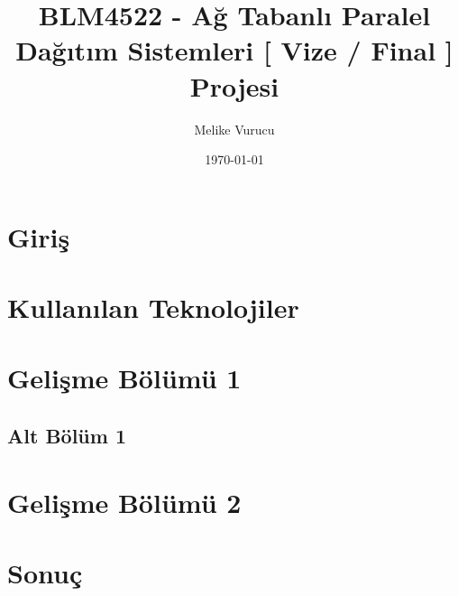 \documentclass[12pt, a4paper]{report}
\title{BLM4522 - Ağ Tabanlı Paralel Dağıtım Sistemleri {[ Vize / Final ]} Projesi}
\author{Melike Vurucu}
\date{\today}
\begin{document}
\maketitle

\tableofcontents

\chapter{Giriş}

\chapter{Kullanılan Teknolojiler}

\chapter{Gelişme Bölümü 1}
\section{Alt Bölüm 1}

\chapter{Gelişme Bölümü 2}

\chapter{Sonuç}
\end{document}
